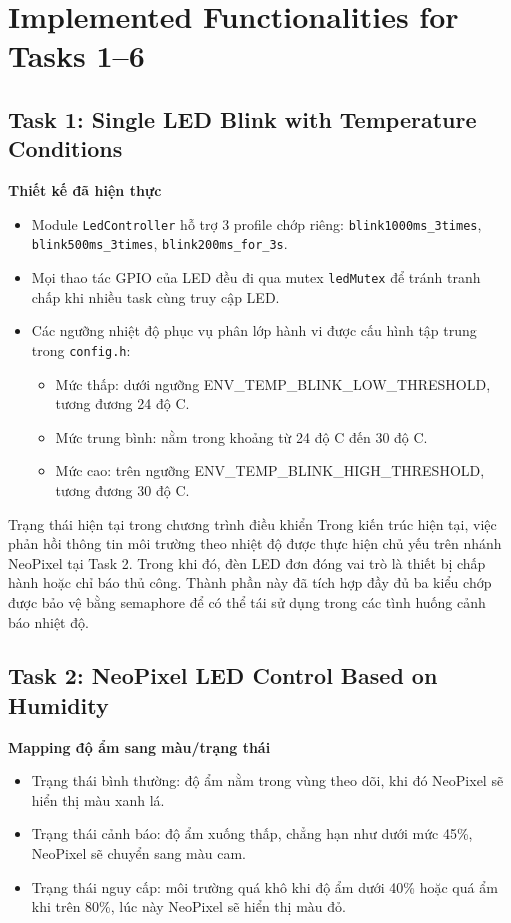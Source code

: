\section{Implemented Functionalities for Tasks 1--6}

\subsection{Task 1: Single LED Blink with Temperature Conditions}
\textbf{Thiết kế đã hiện thực}
\begin{itemize}
    \item Module \texttt{LedController} hỗ trợ 3 profile chớp riêng: \texttt{blink1000ms\_3times}, \texttt{blink500ms\_3times}, \texttt{blink200ms\_for\_3s}.
    \item Mọi thao tác GPIO của LED đều đi qua mutex \texttt{ledMutex} để tránh tranh chấp khi nhiều task cùng truy cập LED.
    \item Các ngưỡng nhiệt độ phục vụ phân lớp hành vi được cấu hình tập trung trong \texttt{config.h}:
    \begin{itemize}
        \item Mức thấp: dưới ngưỡng ENV\_TEMP\_BLINK\_LOW\_THRESHOLD, tương đương 24 độ C.
        \item Mức trung bình: nằm trong khoảng từ 24 độ C đến 30 độ C.
        \item Mức cao: trên ngưỡng ENV\_TEMP\_BLINK\_HIGH\_THRESHOLD, tương đương 30 độ C.
    \end{itemize}
\end{itemize}

Trạng thái hiện tại trong chương trình điều khiển
Trong kiến trúc hiện tại, việc phản hồi thông tin môi trường theo nhiệt độ được thực hiện chủ yếu trên nhánh NeoPixel tại Task 2. Trong khi đó, đèn LED đơn đóng vai trò là thiết bị chấp hành hoặc chỉ báo thủ công. Thành phần này đã tích hợp đầy đủ ba kiểu chớp được bảo vệ bằng semaphore để có thể tái sử dụng trong các tình huống cảnh báo nhiệt độ.

\subsection{Task 2: NeoPixel LED Control Based on Humidity}
\textbf{Mapping độ ẩm sang màu/trạng thái}
\begin{itemize}
    \item Trạng thái bình thường: độ ẩm nằm trong vùng theo dõi, khi đó NeoPixel sẽ hiển thị màu xanh lá.
    \item Trạng thái cảnh báo: độ ẩm xuống thấp, chẳng hạn như dưới mức 45\%, NeoPixel sẽ chuyển sang màu cam.
    \item Trạng thái nguy cấp: môi trường quá khô khi độ ẩm dưới 40\% hoặc quá ẩm khi trên 80\%, lúc này NeoPixel sẽ hiển thị màu đỏ.
\end{itemize}

